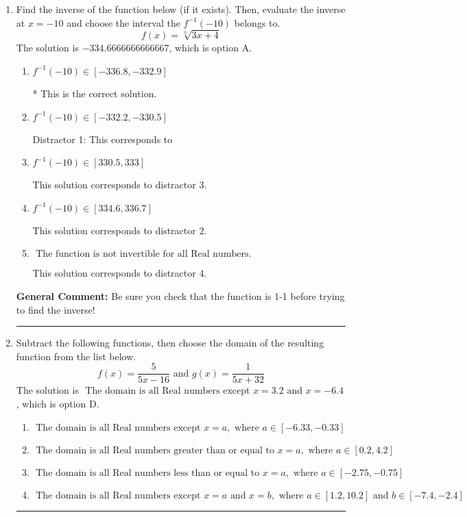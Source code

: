\documentclass{extbook}[14pt]
\newcommand{\litem}[1]{\item #1

\rule{\textwidth}{0.4pt}}
\begin{document}
\begin{enumerate}\litem{
Find the inverse of the function below (if it exists). Then, evaluate the inverse at $x = -10$ and choose the interval the $f^{-1}(-10)$ belongs to.
\[ f(x) = \sqrt[3]{3 x + 4} \]The solution is \( -334.6666666666667 \), which is option A.\begin{enumerate}[label=\Alph*.]
\item \( f^{-1}(-10) \in [-336.8, -332.9] \)

* This is the correct solution.
\item \( f^{-1}(-10) \in [-332.2, -330.5] \)

 Distractor 1: This corresponds to 
\item \( f^{-1}(-10) \in [330.5, 333] \)

 This solution corresponds to distractor 3.
\item \( f^{-1}(-10) \in [334.6, 336.7] \)

 This solution corresponds to distractor 2.
\item \( \text{ The function is not invertible for all Real numbers. } \)

 This solution corresponds to distractor 4.
\end{enumerate}

\textbf{General Comment:} Be sure you check that the function is 1-1 before trying to find the inverse!
}
\litem{
Subtract the following functions, then choose the domain of the resulting function from the list below.
\[ f(x) = \frac{5}{5x-16} \text{ and } g(x) = \frac{1}{5x+32} \]The solution is \( \text{ The domain is all Real numbers except } x = 3.2 \text{ and } x = -6.4 \), which is option D.\begin{enumerate}[label=\Alph*.]
\item \( \text{ The domain is all Real numbers except } x = a, \text{ where } a \in [-6.33, -0.33] \)


\item \( \text{ The domain is all Real numbers greater than or equal to } x = a, \text{ where } a \in [0.2, 4.2] \)


\item \( \text{ The domain is all Real numbers less than or equal to } x = a, \text{ where } a \in [-2.75, -0.75] \)


\item \( \text{ The domain is all Real numbers except } x = a \text{ and } x = b, \text{ where } a \in [1.2, 10.2] \text{ and } b \in [-7.4, -2.4] \)



\end{enumerate}}
\end{enumerate}
\end{document}
